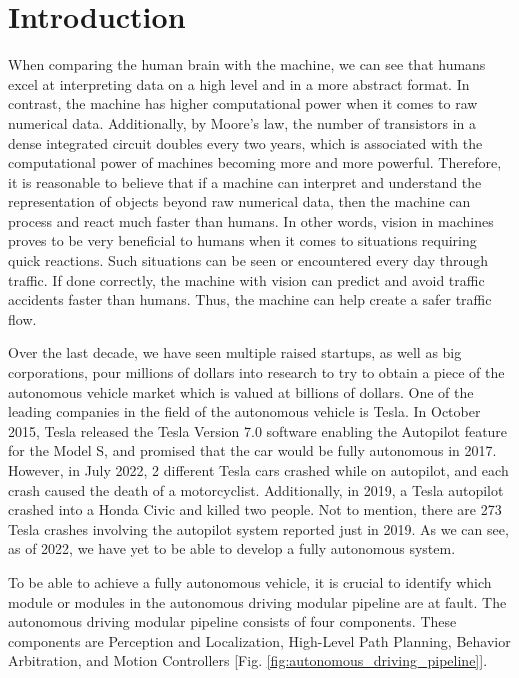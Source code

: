 \chapter{Introduction} \label{sec:introduction}

When comparing the human brain with the machine, we can see that humans excel at interpreting data on a high level and in a more abstract format. In contrast, the machine has higher computational power when it comes to raw numerical data. Additionally, by Moore's law, the number of transistors in a dense integrated circuit doubles every two years, which is associated with the computational power of machines becoming more and more powerful. Therefore, it is reasonable to believe that if a machine can interpret and understand the representation of objects beyond raw numerical data, then the machine can process and react much faster than humans. In other words, vision in machines proves to be very beneficial to humans when it comes to situations requiring quick reactions. Such situations can be seen or encountered every day through traffic. If done correctly, the machine with vision can predict and avoid traffic accidents faster than humans. Thus, the machine can help create a safer traffic flow.

Over the last decade, we have seen multiple raised startups, as well as big corporations, pour millions of dollars into research to try to obtain a piece of the autonomous vehicle market which is valued at billions of dollars. One of the leading companies in the field of the autonomous vehicle is Tesla. In October 2015, Tesla released the Tesla Version 7.0 software enabling the Autopilot feature for the Model S, and promised that the car would be fully autonomous in 2017. However, in July 2022, 2 different Tesla cars crashed while on autopilot, and each crash caused the death of a motorcyclist. Additionally, in 2019, a Tesla autopilot crashed into a Honda Civic and killed two people. Not to mention, there are 273 Tesla crashes involving the autopilot system reported just in 2019. As we can see, as of 2022, we have yet to be able to develop a fully autonomous system.

To be able to achieve a fully autonomous vehicle, it is crucial to identify which module or modules in the autonomous driving modular pipeline are at fault. The autonomous driving modular pipeline consists of four components. These components are Perception and Localization, High-Level Path Planning, Behavior Arbitration, and Motion Controllers [Fig. \ref{fig:autonomous_driving_pipeline}].

